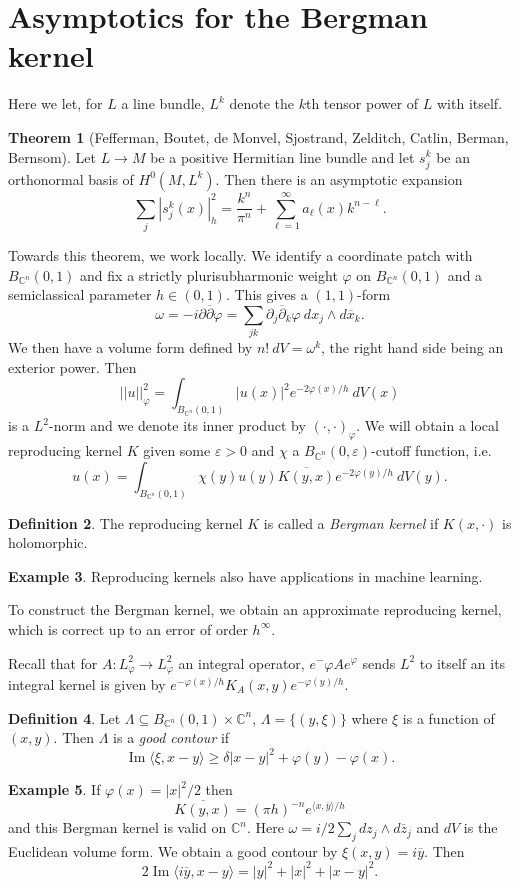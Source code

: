 \documentclass[12pt]{report}
\newcommand{\CC}{\mathbb{C}}
\newcommand{\dbar}{\overline\partial}
\renewcommand{\Im}{\operatorname{Im}}
\newcommand{\dfn}[1]{\emph{#1}\index{#1}}
\theoremstyle{definition}
\newtheorem{theorem}{Theorem}[chapter]
\newtheorem{definition}[theorem]{Definition}
\newtheorem{example}[theorem]{Example}
\begin{document}
\section{Asymptotics for the Bergman kernel}
    Here we let, for $L$ a line bundle, $L^k$ denote the $k$th tensor power of $L$ with itself.
\begin{theorem}[Fefferman, Boutet, de Monvel, Sjostrand, Zelditch, Catlin, Berman, Bernsom]
    Let $L \to M$ be a positive Hermitian line bundle and let $s_j^k$ be an orthonormal basis of $H^0(M, L^k)$. Then there is an asymptotic expansion
    $$\sum_j |s_j^k(x)|^2_h = \frac{k^n}{\pi^n} + \sum_{\ell=1}^\infty a_\ell(x)k^{n-\ell}.$$
\end{theorem}
    Towards this theorem, we work locally. We identify a coordinate patch with $B_{\CC^n}(0, 1)$ and fix a strictly plurisubharmonic weight $\varphi$ on $B_{\CC^n}(0, 1)$ and a semiclassical parameter $h \in (0, 1)$. This gives a $(1, 1)$-form
    $$\omega = -i\partial\dbar\varphi = \sum_{jk} \partial_j \dbar_k \varphi ~dx_j \wedge d\overline x_k.$$
    We then have a volume form defined by $n! ~dV = \omega^k$, the right hand side being an exterior power. Then
    $$||u||_\varphi^2 = \int_{B_{\CC^n}(0, 1)} |u(x)|^2 e^{-2\varphi(x)/h} ~dV(x)$$
    is a $L^2$-norm and we denote its inner product by $(\cdot,\cdot)_\varphi$. We will obtain a local reproducing kernel $K$ given some $\varepsilon > 0$ and $\chi$ a $B_{\CC^n}(0, \varepsilon)$-cutoff function, i.e.
    $$u(x) = \int_{B_{\CC^n}(0, 1)} \chi(y)u(y) \overline{K(y, x)} e^{-2\varphi(y)/h} ~dV(y).$$
\begin{definition}
    The reproducing kernel $K$ is called a \dfn{Bergman kernel} if $K(x, \cdot)$ is holomorphic.
\end{definition}
\begin{example}
    Reproducing kernels also have applications in machine learning.
\end{example}
    To construct the Bergman kernel, we obtain an approximate reproducing kernel, which is correct up to an error of order $h^\infty$.

    Recall that for $A: L^2_\varphi \to L^2_\varphi$ an integral operator, $e^-\varphi A e^\varphi$ sends $L^2$ to itself an its integral kernel is given by $e^{-\varphi(x)/h} K_A(x, y) e^{-\varphi(y)/h}$.

\begin{definition}
    Let $\Lambda \subseteq B_{\CC^n}(0, 1) \times \CC^n$, $\Lambda = \{(y, \xi)\}$ where $\xi$ is a function of $(x, y)$. Then $\Lambda$ is a \dfn{good contour} if
    $$\Im \langle \xi, x - y\rangle \geq \delta|x - y|^2 + \varphi(y) - \varphi(x).$$
\end{definition}
\begin{example}
    If $\varphi(x) = |x|^2/2$ then
    $$\overline{K(y, x)} = (\pi h)^{-n} e^{\langle x, \overline y\rangle/h}$$
    and this Bergman kernel is valid on $\CC^n$. Here $\omega = i/2\sum_j dz_j \wedge d\overline z_j$ and $dV$ is the Euclidean volume form. We obtain a good contour by $\xi(x, y) = i\overline y$. Then
    $$2\Im \langle i\overline y, x - y\rangle = |y|^2 + |x|^2 + |x - y|^2.$$
\end{example}
\end{document}
